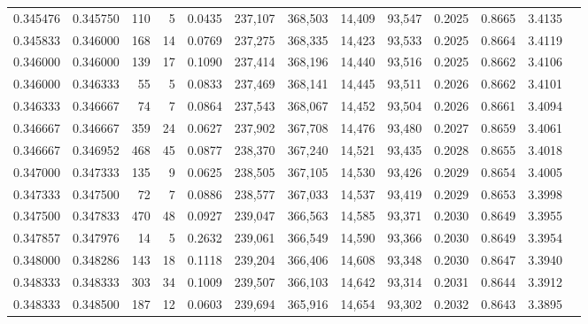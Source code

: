 \begin{tabular}{rrrrrrrrrrrrr}
0.345476 & 0.345750 &   110 &   5 &                                     0.0435 & 237,107 & 368,503 &  14,409 &  93,547 & 0.2025 & 0.8665 & 3.4135 \\
0.345833 & 0.346000 &   168 &  14 &                                     0.0769 & 237,275 & 368,335 &  14,423 &  93,533 & 0.2025 & 0.8664 & 3.4119 \\
0.346000 & 0.346000 &   139 &  17 &                                     0.1090 & 237,414 & 368,196 &  14,440 &  93,516 & 0.2025 & 0.8662 & 3.4106 \\
0.346000 & 0.346333 &    55 &   5 &                                     0.0833 & 237,469 & 368,141 &  14,445 &  93,511 & 0.2026 & 0.8662 & 3.4101 \\
0.346333 & 0.346667 &    74 &   7 &                                     0.0864 & 237,543 & 368,067 &  14,452 &  93,504 & 0.2026 & 0.8661 & 3.4094 \\
0.346667 & 0.346667 &   359 &  24 &                                     0.0627 & 237,902 & 367,708 &  14,476 &  93,480 & 0.2027 & 0.8659 & 3.4061 \\
0.346667 & 0.346952 &   468 &  45 &                                     0.0877 & 238,370 & 367,240 &  14,521 &  93,435 & 0.2028 & 0.8655 & 3.4018 \\
0.347000 & 0.347333 &   135 &   9 &                                     0.0625 & 238,505 & 367,105 &  14,530 &  93,426 & 0.2029 & 0.8654 & 3.4005 \\
0.347333 & 0.347500 &    72 &   7 &                                     0.0886 & 238,577 & 367,033 &  14,537 &  93,419 & 0.2029 & 0.8653 & 3.3998 \\
0.347500 & 0.347833 &   470 &  48 &                                     0.0927 & 239,047 & 366,563 &  14,585 &  93,371 & 0.2030 & 0.8649 & 3.3955 \\
0.347857 & 0.347976 &    14 &   5 &                                     0.2632 & 239,061 & 366,549 &  14,590 &  93,366 & 0.2030 & 0.8649 & 3.3954 \\
0.348000 & 0.348286 &   143 &  18 &                                     0.1118 & 239,204 & 366,406 &  14,608 &  93,348 & 0.2030 & 0.8647 & 3.3940 \\
0.348333 & 0.348333 &   303 &  34 &                                     0.1009 & 239,507 & 366,103 &  14,642 &  93,314 & 0.2031 & 0.8644 & 3.3912 \\
0.348333 & 0.348500 &   187 &  12 &                                     0.0603 & 239,694 & 365,916 &  14,654 &  93,302 & 0.2032 & 0.8643 & 3.3895 \\

\end{tabular}
